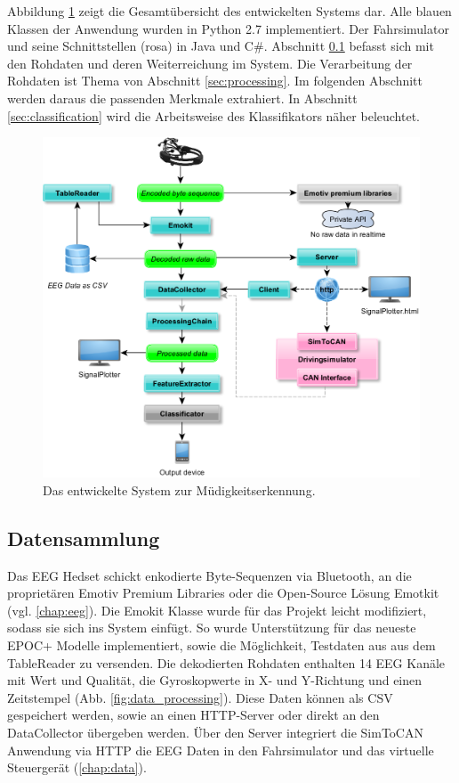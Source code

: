 {Abbildung \ref{fig:data_stream} zeigt die Gesamtübersicht des entwickelten Systems dar. Alle blauen Klassen der Anwendung wurden in Python 2.7 implementiert. Der Fahrsimulator und seine Schnittstellen (rosa) in Java und C\#. Abschnitt \ref{sec:fetching} befasst sich mit den Rohdaten und deren Weiterreichung im System. Die Verarbeitung der Rohdaten ist Thema von Abschnitt \ref{sec:processing}. Im folgenden Abschnitt werden daraus die passenden Merkmale extrahiert. In Abschnitt \ref{sec:classification} wird die Arbeitsweise des Klassifikators näher beleuchtet. 


\begin{figure} 
  \begin{center}
    \includegraphics[width=12cm]{data_stream}
    \caption[Aufbau]{Das entwickelte System zur Müdigkeitserkennung. \label{fig:data_stream}}
  \end{center}
\end{figure}

\subsection{Datensammlung}
\label{sec:fetching}
 
Das EEG Hedset schickt enkodierte Byte-Sequenzen via Bluetooth, an die proprietären Emotiv Premium Libraries oder die Open-Source Lösung Emotkit (vgl. \ref{chap:eeg}). Die Emokit Klasse wurde für das Projekt leicht modifiziert, sodass sie sich ins System einfügt. So wurde Unterstützung für das neueste EPOC+ Modelle implementiert, sowie die Möglichkeit, Testdaten  aus aus dem TableReader zu versenden. 
Die dekodierten Rohdaten enthalten 14 EEG Kanäle mit Wert und Qualität, die Gyroskopwerte in X- und Y-Richtung und einen Zeitstempel (Abb. \ref{fig:data_processing}). Diese Daten können als CSV gespeichert werden, sowie an einen HTTP-Server oder direkt an den DataCollector übergeben werden. Über den Server integriert die SimToCAN Anwendung via HTTP die EEG Daten in den Fahrsimulator und das virtuelle Steuergerät (\ref{chap:data}).

}
